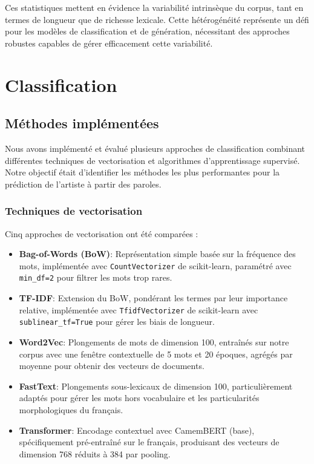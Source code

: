 \documentclass[a4paper,11pt]{article}
\begin{document}
Ces statistiques mettent en évidence la variabilité intrinsèque du corpus, tant en termes de longueur que de richesse lexicale. Cette hétérogénéité représente un défi pour les modèles de classification et de génération, nécessitant des approches robustes capables de gérer efficacement cette variabilité.

\section{Classification}
\label{sec:classification}

\subsection{Méthodes implémentées}
Nous avons implémenté et évalué plusieurs approches de classification combinant différentes techniques de vectorisation et algorithmes d'apprentissage supervisé. Notre objectif était d'identifier les méthodes les plus performantes pour la prédiction de l'artiste à partir des paroles.

\subsubsection{Techniques de vectorisation}
Cinq approches de vectorisation ont été comparées :

\begin{itemize}
    \item \textbf{Bag-of-Words (BoW)}: Représentation simple basée sur la fréquence des mots, implémentée avec \texttt{CountVectorizer} de scikit-learn, paramétré avec \texttt{min\_df=2} pour filtrer les mots trop rares.
    
    \item \textbf{TF-IDF}: Extension du BoW, pondérant les termes par leur importance relative, implémentée avec \texttt{TfidfVectorizer} de scikit-learn avec \texttt{sublinear\_tf=True} pour gérer les biais de longueur.
    
    \item \textbf{Word2Vec}: Plongements de mots de dimension 100, entraînés sur notre corpus avec une fenêtre contextuelle de 5 mots et 20 époques, agrégés par moyenne pour obtenir des vecteurs de documents.
    
    \item \textbf{FastText}: Plongements sous-lexicaux de dimension 100, particulièrement adaptés pour gérer les mots hors vocabulaire et les particularités morphologiques du français.
    
    \item \textbf{Transformer}: Encodage contextuel avec CamemBERT (base), spécifiquement pré-entraîné sur le français, produisant des vecteurs de dimension 768 réduits à 384 par pooling.
\end{itemize}
\end{document}
